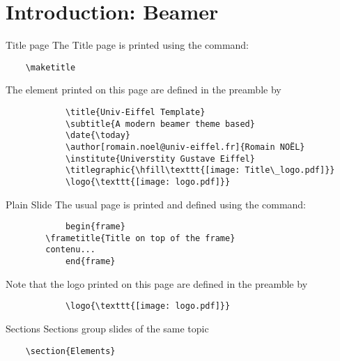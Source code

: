 \documentclass[aspectratio=169]{beamer}
\begin{document}


\section{Introduction: Beamer}

	\begin{frame}[fragile]{Title page}
		The Title page is printed using the command:			
		\begin{verbatim}    \maketitle\end{verbatim}
		
		The element printed on this page are defined in the preamble by
		\begin{verbatim}
			\title{Univ-Eiffel Template}
			\subtitle{A modern beamer theme based}
			\date{\today}
			\author[romain.noel@univ-eiffel.fr]{Romain NOËL}
			\institute{Universtity Gustave Eiffel}
			\titlegraphic{\hfill\texttt{[image: Title\_logo.pdf]}}
			\logo{\texttt{[image: logo.pdf]}}
		\end{verbatim}
	\end{frame}
	
	\begin{frame}[fragile]{Plain Slide}
		The usual page is printed and defined using the command:			
		\begin{verbatim}
			begin{frame}
		\frametitle{Title on top of the frame}
		contenu...
			end{frame}
		\end{verbatim}
		
		Note that the logo printed on this page are defined in the preamble by
		\begin{verbatim}
			\logo{\texttt{[image: logo.pdf]}}
		\end{verbatim}
	\end{frame}

	\begin{frame}[fragile]{Sections}
		Sections group slides of the same topic
		
		\begin{verbatim}    \section{Elements}\end{verbatim}
	\end{frame}
\end{document}
